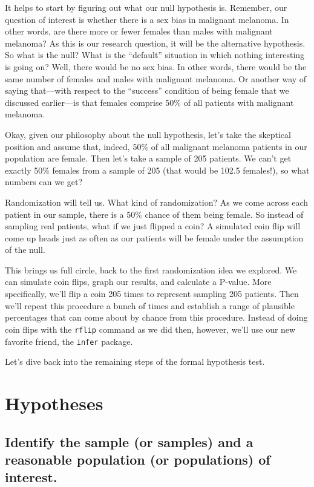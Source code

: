 \documentclass[
]{book}
\begin{document}
It helps to start by figuring out what our null hypothesis is. Remember, our question of interest is whether there is a sex bias in malignant melanoma. In other words, are there more or fewer females than males with malignant melanoma? As this is our research question, it will be the alternative hypothesis. So what is the null? What is the ``default'' situation in which nothing interesting is going on? Well, there would be no sex bias. In other words, there would be the same number of females and males with malignant melanoma. Or another way of saying that---with respect to the ``success'' condition of being female that we discussed earlier---is that females comprise 50\% of all patients with malignant melanoma.

Okay, given our philosophy about the null hypothesis, let's take the skeptical position and assume that, indeed, 50\% of all malignant melanoma patients in our population are female. Then let's take a sample of 205 patients. We can't get exactly 50\% females from a sample of 205 (that would be 102.5 females!), so what numbers can we get?

Randomization will tell us. What kind of randomization? As we come across each patient in our sample, there is a 50\% chance of them being female. So instead of sampling real patients, what if we just flipped a coin? A simulated coin flip will come up heads just as often as our patients will be female under the assumption of the null.

This brings us full circle, back to the first randomization idea we explored. We can simulate coin flips, graph our results, and calculate a P-value. More specifically, we'll flip a coin 205 times to represent sampling 205 patients. Then we'll repeat this procedure a bunch of times and establish a range of plausible percentages that can come about by chance from this procedure. Instead of doing coin flips with the \texttt{rflip} command as we did then, however, we'll use our new favorite friend, the \texttt{infer} package.

Let's dive back into the remaining steps of the formal hypothesis test.

\hypertarget{hypothesis2-ex-hypotheses}{%
\section{Hypotheses}\label{hypothesis2-ex-hypotheses}}

\hypertarget{hypothesis2-ex-sample-pop}{%
\subsection{Identify the sample (or samples) and a reasonable population (or populations) of interest.}\label{hypothesis2-ex-sample-pop}}
\end{document}
